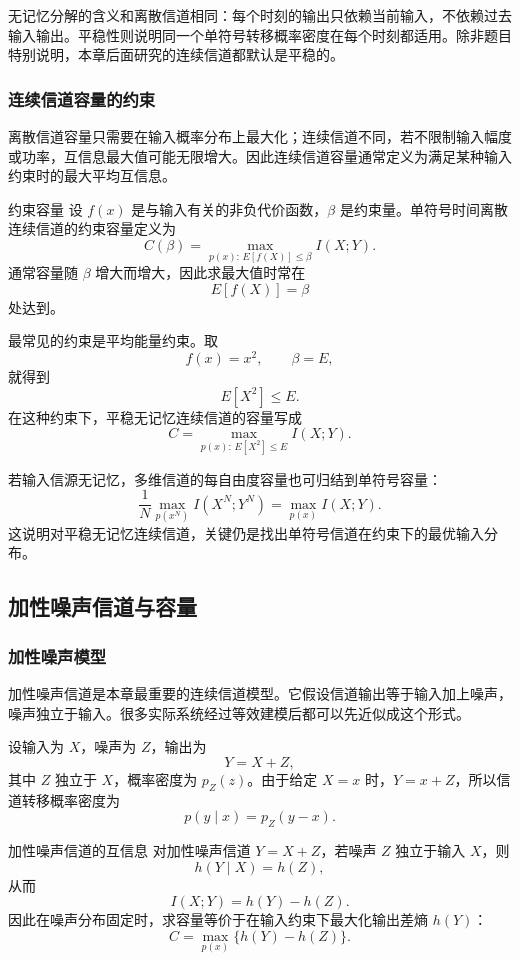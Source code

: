 无记忆分解的含义和离散信道相同：每个时刻的输出只依赖当前输入，不依赖过去输入输出。平稳性则说明同一个单符号转移概率密度在每个时刻都适用。除非题目特别说明，本章后面研究的连续信道都默认是平稳的。

\subsubsection{连续信道容量的约束}

离散信道容量只需要在输入概率分布上最大化；连续信道不同，若不限制输入幅度或功率，互信息最大值可能无限增大。因此连续信道容量通常定义为满足某种输入约束时的最大平均互信息。

\begin{definitionBox}{约束容量}
设 $f(x)$ 是与输入有关的非负代价函数，$\beta$ 是约束量。单符号时间离散连续信道的约束容量定义为
\[
C(\beta)=\max_{p(x):\,E[f(X)]\le\beta} I(X;Y).
\]
通常容量随 $\beta$ 增大而增大，因此求最大值时常在
\[
E[f(X)]=\beta
\]
处达到。
\end{definitionBox}

最常见的约束是平均能量约束。取
\[
f(x)=x^2,
\qquad
\beta=E,
\]
就得到
\[
E[X^2]\le E.
\]
在这种约束下，平稳无记忆连续信道的容量写成
\[
C=\max_{p(x):\,E[X^2]\le E} I(X;Y).
\]

若输入信源无记忆，多维信道的每自由度容量也可归结到单符号容量：
\[
\frac1N\max_{p(x^N)}I(X^N;Y^N)=\max_{p(x)}I(X;Y).
\]
这说明对平稳无记忆连续信道，关键仍是找出单符号信道在约束下的最优输入分布。

\subsection{加性噪声信道与容量}

\subsubsection{加性噪声模型}

加性噪声信道是本章最重要的连续信道模型。它假设信道输出等于输入加上噪声，噪声独立于输入。很多实际系统经过等效建模后都可以先近似成这个形式。

设输入为 $X$，噪声为 $Z$，输出为
\[
Y=X+Z,
\]
其中 $Z$ 独立于 $X$，概率密度为 $p_Z(z)$。由于给定 $X=x$ 时，$Y=x+Z$，所以信道转移概率密度为
\[
p(y\mid x)=p_Z(y-x).
\]

\begin{theoremBox}{加性噪声信道的互信息}
对加性噪声信道 $Y=X+Z$，若噪声 $Z$ 独立于输入 $X$，则
\[
h(Y\mid X)=h(Z),
\]
从而
\[
I(X;Y)=h(Y)-h(Z).
\]
因此在噪声分布固定时，求容量等价于在输入约束下最大化输出差熵 $h(Y)$：
\[
C=\max_{p(x)}\{h(Y)-h(Z)\}.
\]
\end{theoremBox}


